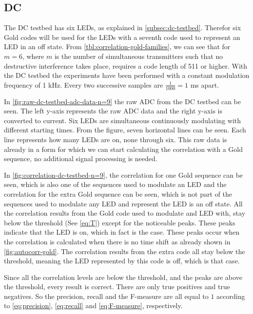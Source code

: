 
\subsection{DC}
\label{subsec:dc-testbed-eval}

The DC testbed has six LEDs, as explained in \autoref{subsec:dc-testbed}.
Therefor six Gold codes will be used for the LEDs with a seventh code used to represent an LED in an off state.
From \autoref{tbl:correlation-gold-families}, we can see that for $m = 6$, where $m$ is the number of simultaneous transmitters such that no destructive interference takes place, requires a code length of 511 or higher.
With the DC testbed the experiments have been performed with a constant modulation frequency of 1 kHz.
Every two successive samples are $\frac{1}{1000} = 1$ ms apart.

In \autoref{fig:raw-dc-testbed-adc-data-n=9} the raw ADC from the DC testbed can be seen.
The left y-axis represents the raw ADC data and the right y-axis is converted to current.
Six LEDs are simultaneous continuously modulating with different starting times.
From the figure, seven horizontal lines can be seen.
Each line represents how many LEDs are on, none through six.
This raw data is already in a form for which we can start calculating the correlation with a Gold sequence, no additional signal processing is needed.

In \autoref{fig:correlation-dc-testbed-n=9}, the correlation for one Gold sequence can be seen, which is also one of the sequences used to modulate an LED and the correlation for the extra Gold sequence can be seen, which is not part of the sequences used to modulate any LED and represent the LED is an off state.
All the correlation results from the Gold code used to modulate and LED with, stay below the threshold (See \autoref{eq:T}) except for the noticeable peaks.
These peaks indicate that the LED is on, which in fact is the case.
These peaks occur when the correlation is calculated when there is no time shift as already shown in \autoref{fig:autocorr-gold}.
The correlation results from the extra code all stay below the threshold, meaning the LED represented by this code is off, which is that case.

Since all the correlation levels are below the threshold, and the peaks are above the threshold, every result is correct.
There are only true positives and true negatives.
So the precision, recall and the F-measure are all equal to $1$ according to \autoref{eq:precision}, \autoref{eq:recall} and \autoref{eq:F-measure}, respectively.

